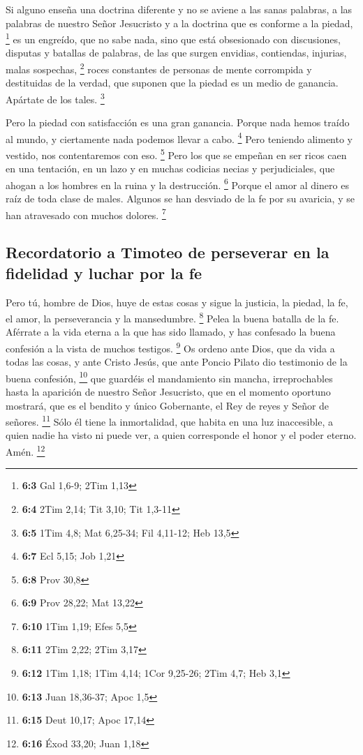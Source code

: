  Si alguno enseña una doctrina diferente y no se aviene a
las sanas palabras, a las palabras de nuestro Señor Jesucristo y a la
doctrina que es conforme a la piedad, \footnote{\textbf{6:3} Gal 1,6-9;
  2Tim 1,13}  es un engreído, que no sabe nada, sino que
está obsesionado con discusiones, disputas y batallas de palabras, de
las que surgen envidias, contiendas, injurias, malas sospechas,
\footnote{\textbf{6:4} 2Tim 2,14; Tit 3,10; Tit 1,3-11} 
roces constantes de personas de mente corrompida y destituidas de la
verdad, que suponen que la piedad es un medio de ganancia. Apártate de
los tales. \footnote{\textbf{6:5} 1Tim 4,8; Mat 6,25-34; Fil 4,11-12;
  Heb 13,5}

 Pero la piedad con satisfacción es una gran ganancia.
 Porque nada hemos traído al mundo, y ciertamente nada
podemos llevar a cabo. \footnote{\textbf{6:7} Ecl 5,15; Job 1,21}
 Pero teniendo alimento y vestido, nos contentaremos con
eso. \footnote{\textbf{6:8} Prov 30,8}  Pero los que se
empeñan en ser ricos caen en una tentación, en un lazo y en muchas
codicias necias y perjudiciales, que ahogan a los hombres en la ruina y
la destrucción. \footnote{\textbf{6:9} Prov 28,22; Mat 13,22}
 Porque el amor al dinero es raíz de toda clase de males.
Algunos se han desviado de la fe por su avaricia, y se han atravesado
con muchos dolores. \footnote{\textbf{6:10} 1Tim 1,19; Efes 5,5}

\hypertarget{recordatorio-a-timoteo-de-perseverar-en-la-fidelidad-y-luchar-por-la-fe}{%
\subsection{Recordatorio a Timoteo de perseverar en la fidelidad y
luchar por la
fe}\label{recordatorio-a-timoteo-de-perseverar-en-la-fidelidad-y-luchar-por-la-fe}}

 Pero tú, hombre de Dios, huye de estas cosas y sigue la
justicia, la piedad, la fe, el amor, la perseverancia y la mansedumbre.
\footnote{\textbf{6:11} 2Tim 2,22; 2Tim 3,17}  Pelea la
buena batalla de la fe. Aférrate a la vida eterna a la que has sido
llamado, y has confesado la buena confesión a la vista de muchos
testigos. \footnote{\textbf{6:12} 1Tim 1,18; 1Tim 4,14; 1Cor 9,25-26;
  2Tim 4,7; Heb 3,1}  Os ordeno ante Dios, que da vida a
todas las cosas, y ante Cristo Jesús, que ante Poncio Pilato dio
testimonio de la buena confesión, \footnote{\textbf{6:13} Juan 18,36-37;
  Apoc 1,5}  que guardéis el mandamiento sin mancha,
irreprochables hasta la aparición de nuestro Señor Jesucristo,
 que en el momento oportuno mostrará, que es el bendito y
único Gobernante, el Rey de reyes y Señor de señores. \footnote{\textbf{6:15}
  Deut 10,17; Apoc 17,14}  Sólo él tiene la inmortalidad,
que habita en una luz inaccesible, a quien nadie ha visto ni puede ver,
a quien corresponde el honor y el poder eterno. Amén. \footnote{\textbf{6:16}
  Éxod 33,20; Juan 1,18}


